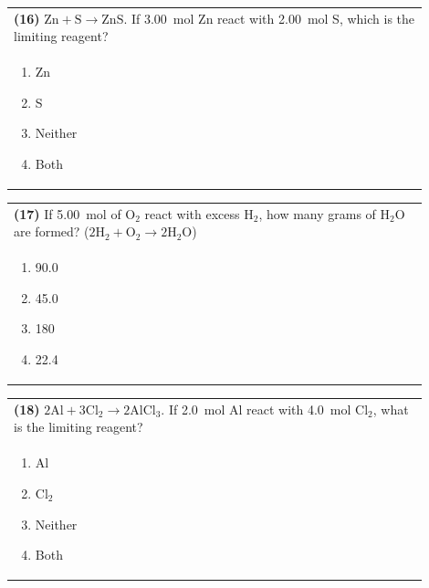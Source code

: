 \documentclass{article}
\begin{document}
{{\vspace{0.2cm}
\noindent\begin{tabular}{|p{0.9\linewidth}|}
\hline
\textbf{(16)} $\text{Zn} + \text{S} \rightarrow \text{ZnS}$. If 3.00~mol Zn react with 2.00~mol S, which is the limiting reagent?\\[0.2cm]

\begin{minipage}[t]{0.85\linewidth}
\begin{enumerate}[label=\alph*.]
\item Zn
\item S
\item Neither
\item Both
\end{enumerate}
\end{minipage}\\[0.2cm]
\hline
\end{tabular}

\newpage

\noindent\begin{tabular}{|p{0.9\linewidth}|}
\hline
\textbf{(17)} If 5.00~mol of O$_2$ react with excess H$_2$, how many grams of H$_2$O are formed? ($2\text{H}_2 + \text{O}_2 \rightarrow 2\text{H}_2\text{O}$)\\[0.2cm]

\begin{minipage}[t]{0.85\linewidth}
\begin{enumerate}[label=\alph*.]
\item 90.0
\item 45.0
\item 180
\item 22.4
\end{enumerate}
\end{minipage}\\[0.2cm]
\hline
\end{tabular}

\vspace{0.2cm}
\noindent\begin{tabular}{|p{0.9\linewidth}|}
\hline
\textbf{(18)} $2\text{Al} + 3\text{Cl}_2 \rightarrow 2\text{AlCl}_3$. If 2.0~mol Al react with 4.0~mol Cl$_2$, what is the limiting reagent?\\[0.2cm]

\begin{minipage}[t]{0.85\linewidth}
\begin{enumerate}[label=\alph*.]
\item Al
\item Cl$_2$
\item Neither
\item Both
\end{enumerate}
\end{minipage}\\[0.2cm]
\hline
\end{tabular}

}}
\end{document}
